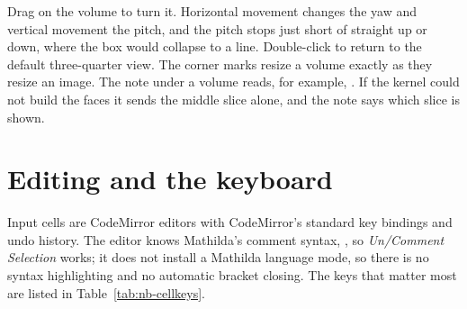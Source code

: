 Drag on the volume to turn it. Horizontal movement changes the yaw and
vertical movement the pitch, and the pitch stops just short of straight up
or down, where the box would collapse to a line. Double-click to return to
the default three-quarter view. The corner marks resize a volume exactly as
they resize an image. The note under a volume reads, for example,
. If the kernel could not build the faces it sends
the middle slice alone, and the note says which slice is shown.

\section{Editing and the keyboard}
\label{sec:nb-keyboard}

Input cells are CodeMirror editors with CodeMirror's standard key bindings
and undo history. The editor knows Mathilda's comment syntax,
\mcode{(* \ldots{} *)}, so \emph{Un/Comment Selection} works; it does not
install a Mathilda language mode, so there is no syntax highlighting and no
automatic bracket closing. The keys that matter most are listed in
Table~\ref{tab:nb-cellkeys}.

